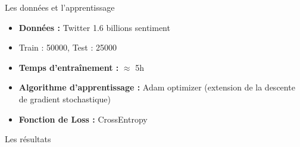 \documentclass[12pt]{beamer}
\begin{document}

\begin{frame}{Les données et l'apprentissage}

\begin{itemize}
	\item \textbf{Données : } Twitter 1.6 billions sentiment
	\item Train : 50000, Test : 25000
	\item \textbf{Temps d'entraînement : } $\approx$ 5h
	\item \textbf{Algorithme d'apprentissage : } Adam optimizer (extension de la descente de gradient stochastique)
	\item \textbf{Fonction de Loss : } CrossEntropy
\end{itemize}

\end{frame}




\begin{frame}{Les résultats}

\begin{center}
\resizebox{(\textwidth * 11 / 11)}{!}{
\begin{tikzpicture}

\end{tikzpicture}
}
\end{center}

\end{frame}



\end{document}
